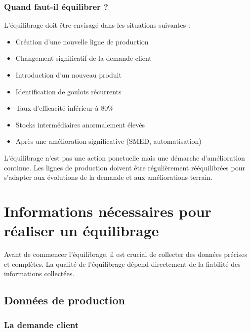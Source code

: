 \documentclass[12pt,a4paper]{article}
\newenvironment{importantnote}
  {\begin{tcolorbox}[colback=blue!5!white, colframe=blue!50!black, title=\textbf{Point Important}]\small}
  {\end{tcolorbox}}
\begin{document}
\subsubsection{Quand faut-il équilibrer ?}

L'équilibrage doit être envisagé dans les situations suivantes :
\begin{itemize}
    \item Création d'une nouvelle ligne de production
    \item Changement significatif de la demande client
    \item Introduction d'un nouveau produit
    \item Identification de goulots récurrents
    \item Taux d'efficacité inférieur à 80\%
    \item Stocks intermédiaires anormalement élevés
    \item Après une amélioration significative (SMED, automatisation)
\end{itemize}

\begin{importantnote}
L'équilibrage n'est pas une action ponctuelle mais une démarche d'amélioration continue. Les lignes de production doivent être régulièrement rééquilibrées pour s'adapter aux évolutions de la demande et aux améliorations terrain.
\end{importantnote}

\newpage
\section{Informations nécessaires pour réaliser un équilibrage}

Avant de commencer l'équilibrage, il est crucial de collecter des données précises et complètes. La qualité de l'équilibrage dépend directement de la fiabilité des informations collectées.

\subsection{Données de production}

\subsubsection{La demande client}
\end{document}
